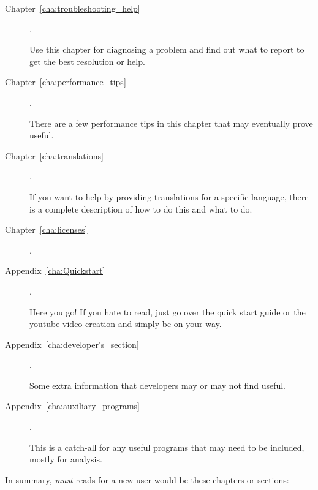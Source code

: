 \begin{description}
    \item[Chapter~\ref{cha:troubleshooting_help}] .

        Use this chapter for diagnosing a problem and find out what to report to get the best resolution or help.

    \item[Chapter~\ref{cha:performance_tips}]  .

        There are a few performance tips in this chapter that may eventually prove useful.

    \item[Chapter~\ref{cha:translations}] .

        If you want to help by providing translations for a specific language, there is a complete description of how to do this and what to do.

    \item[Chapter~\ref{cha:licenses}] .

    \item[Appendix~\ref{cha:Quickstart}] .

        Here you go! If you hate to read, just go over the quick start guide or the youtube video creation and simply be on your way.

    \item[Appendix~\ref{cha:developer's_section}] .

        Some extra information that developers may or may not find useful.

    \item[Appendix~\ref{cha:auxiliary_programs}] .

        This is a catch-all for any useful programs that may need to be included, mostly for analysis.

\end{description}

In summary, \textit{must} reads for a new user would be these chapters or sections:

